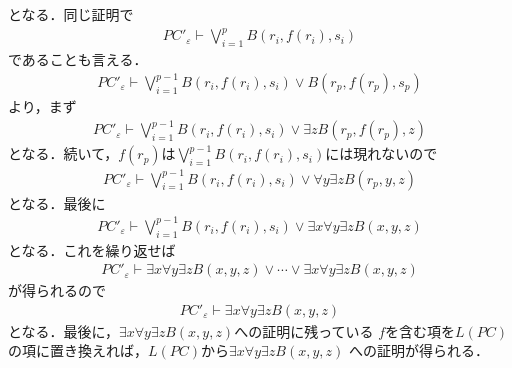 	となる．同じ証明で
	\begin{align}
		{PC'}_{\varepsilon} \vdash \bigvee_{i=1}^{p} B(r_{i},f(r_{i}),s_{i})
	\end{align}
	であることも言える．
	\begin{align}
		{PC'}_{\varepsilon} \vdash \bigvee_{i=1}^{p-1} B(r_{i},f(r_{i}),s_{i})
		\vee B(r_{p},f(r_{p}),s_{p})
	\end{align}
	より，まず
	\begin{align}
		{PC'}_{\varepsilon} \vdash \bigvee_{i=1}^{p-1} B(r_{i},f(r_{i}),s_{i})
		\vee \exists z B(r_{p},f(r_{p}),z)
	\end{align}
	となる．続いて，$f(r_{p})$は$\bigvee_{i=1}^{p-1} B(r_{i},f(r_{i}),s_{i})$には現れないので
	\begin{align}
		{PC'}_{\varepsilon} \vdash \bigvee_{i=1}^{p-1} B(r_{i},f(r_{i}),s_{i})
		\vee \forall y \exists z B(r_{p},y,z)
	\end{align}
	となる．最後に
	\begin{align}
		{PC'}_{\varepsilon} \vdash \bigvee_{i=1}^{p-1} B(r_{i},f(r_{i}),s_{i})
		\vee \exists x \forall y \exists z B(x,y,z)
	\end{align}
	となる．これを繰り返せば
	\begin{align}
		{PC'}_{\varepsilon} \vdash \exists x \forall y \exists z B(x,y,z)
		\vee \cdots \vee \exists x \forall y \exists z B(x,y,z)
	\end{align}
	が得られるので
	\begin{align}
		{PC'}_{\varepsilon} \vdash \exists x \forall y \exists z B(x,y,z)
	\end{align}
	となる．最後に，$\exists x \forall y \exists z B(x,y,z)$への証明に残っている
	$f$を含む項を$L(PC)$の項に置き換えれば，$L(PC)$から$\exists x \forall y \exists z B(x,y,z)$
	への証明が得られる．